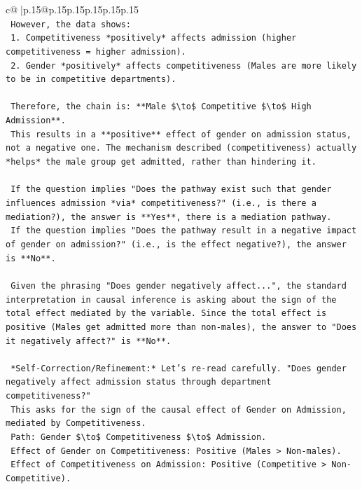 \documentclass{article}
\begin{document}
{\begin{supertabular}{c@{$\;$}|p{.15\linewidth}@{}p{.15\linewidth}p{.15\linewidth}p{.15\linewidth}p{.15\linewidth}p{.15\linewidth}}
{{{\\ 
\texttt{        However, the data shows:} \\
\texttt{        1.  Competitiveness *positively* affects admission (higher competitiveness = higher admission).} \\
\texttt{        2.  Gender *positively* affects competitiveness (Males are more likely to be in competitive departments).} \\
\\ 
\texttt{        Therefore, the chain is: **Male \$\textbackslash{}to\$ Competitive \$\textbackslash{}to\$ High Admission**.} \\
\texttt{        This results in a **positive** effect of gender on admission status, not a negative one. The mechanism described (competitiveness) actually *helps* the male group get admitted, rather than hindering it.} \\
\\ 
\texttt{        If the question implies "Does the pathway exist such that gender influences admission *via* competitiveness?" (i.e., is there a mediation?), the answer is **Yes**, there is a mediation pathway.} \\
\texttt{        If the question implies "Does the pathway result in a negative impact of gender on admission?" (i.e., is the effect negative?), the answer is **No**.} \\
\\ 
\texttt{        Given the phrasing "Does gender negatively affect...", the standard interpretation in causal inference is asking about the sign of the total effect mediated by the variable. Since the total effect is positive (Males get admitted more than non{-}males), the answer to "Does it negatively affect?" is **No**.} \\
\\ 
\texttt{        *Self{-}Correction/Refinement:* Let's re{-}read carefully. "Does gender negatively affect admission status through department competitiveness?"} \\
\texttt{        This asks for the sign of the causal effect of Gender on Admission, mediated by Competitiveness.} \\
\texttt{        Path: Gender \$\textbackslash{}to\$ Competitiveness \$\textbackslash{}to\$ Admission.} \\
\texttt{        Effect of Gender on Competitiveness: Positive (Males > Non{-}males).} \\
\texttt{        Effect of Competitiveness on Admission: Positive (Competitive > Non{-}Competitive).} \\
}}}
\end{supertabular}}
\end{document}
